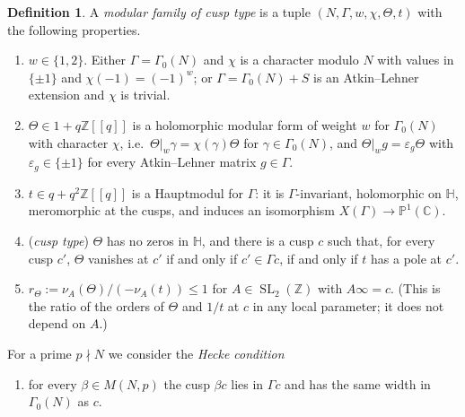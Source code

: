 \documentclass[11pt,a4paper]{article}
\theoremstyle{definition}\newtheorem{definition}[theorem]{Definition}
\theoremstyle{remark}\newtheorem{remark}[theorem]{Remark}
\newcommand{\Z}{\mathbb Z}
\newcommand{\C}{\mathbb C}
\newcommand{\Hb}{\mathbb H}
\DeclareMathOperator{\SL}{SL}
\numberwithin{equation}{section}
\begin{document}
\begin{definition}\label{B:def:cusp}
A \emph{modular family of cusp type} is a tuple $(N,\Gamma,w,\chi,\Theta,t)$ with the following
properties.
\begin{enumerate}[label=\textup{(F\arabic*)}]
\item $w\in\{1,2\}$. Either $\Gamma=\Gamma_0(N)$ and $\chi$ is a character modulo $N$ with values
in $\{\pm1\}$ and $\chi(-1)=(-1)^w$; or $\Gamma=\Gamma_0(N)+S$ is an Atkin--Lehner extension and
$\chi$ is trivial.
\item $\Theta\in1+q\Z[[q]]$ is a holomorphic modular form of weight $w$ for $\Gamma_0(N)$ with
character $\chi$, i.e.\ $\Theta|_w\gamma=\chi(\gamma)\Theta$ for $\gamma\in\Gamma_0(N)$, and
$\Theta|_wg=\varepsilon_g\Theta$ with $\varepsilon_g\in\{\pm1\}$ for every Atkin--Lehner matrix
$g\in\Gamma$.
\item $t\in q+q^2\Z[[q]]$ is a Hauptmodul for $\Gamma$: it is $\Gamma$-invariant, holomorphic on
$\Hb$, meromorphic at the cusps, and induces an isomorphism $X(\Gamma)\to\mathbb P^1(\C)$.
\item ({\it cusp type}) $\Theta$ has no zeros in $\Hb$, and there is a cusp $c$ such that, for every
cusp $c'$, $\Theta$ vanishes at $c'$ if and only if $c'\in\Gamma c$, if and only if $t$ has a pole
at $c'$.
\item $r_\Theta:=\nu_A(\Theta)/(-\nu_A(t))\le1$ for $A\in\SL_2(\Z)$ with $A\infty=c$. (This is the
ratio of the orders of $\Theta$ and $1/t$ at $c$ in any local parameter; it does not depend on $A$.)
\end{enumerate}
For a prime $p\nmid N$ we consider the \emph{Hecke condition}
\begin{enumerate}[label=\textup{(C$_p$)}]
\item for every $\beta\in M(N,p)$ the cusp $\beta c$ lies in $\Gamma c$ and has the same width in
$\Gamma_0(N)$ as $c$.
\end{enumerate}
\end{definition}
\end{document}
